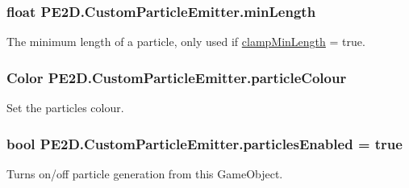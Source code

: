 \hypertarget{class_p_e2_d_1_1_custom_particle_emitter_aaea8df4050265a7c0e07a35b9c9fde0e}{}
\subsubsection[{min\+Length}]{\setlength{\rightskip}{0pt plus 5cm}float P\+E2\+D.\+Custom\+Particle\+Emitter.\+min\+Length}\label{class_p_e2_d_1_1_custom_particle_emitter_aaea8df4050265a7c0e07a35b9c9fde0e}


The minimum length of a particle, only used if \hyperlink{class_p_e2_d_1_1_custom_particle_emitter_ab860a5e7888aa0c849a9815e3934bc7f}{clamp\+Min\+Length} = true. 

\hypertarget{class_p_e2_d_1_1_custom_particle_emitter_a1ceaf22fc2d96bb356dfc6c86b6d2d66}{}
\subsubsection[{particle\+Colour}]{\setlength{\rightskip}{0pt plus 5cm}Color P\+E2\+D.\+Custom\+Particle\+Emitter.\+particle\+Colour}\label{class_p_e2_d_1_1_custom_particle_emitter_a1ceaf22fc2d96bb356dfc6c86b6d2d66}


Set the particles colour. 

\hypertarget{class_p_e2_d_1_1_custom_particle_emitter_a502b91bc7626becb13d2d908f8cc679d}{}
\subsubsection[{particles\+Enabled}]{\setlength{\rightskip}{0pt plus 5cm}bool P\+E2\+D.\+Custom\+Particle\+Emitter.\+particles\+Enabled = true}\label{class_p_e2_d_1_1_custom_particle_emitter_a502b91bc7626becb13d2d908f8cc679d}


Turns on/off particle generation from this Game\+Object. 

